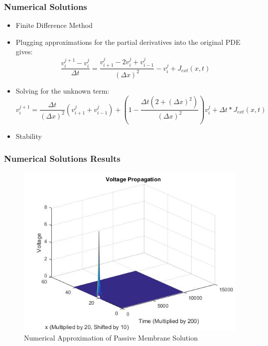 \documentclass{beamer}
\begin{document}
\begin{frame}
\frametitle{Numerical Solutions}
\begin{itemize}
	\item{Finite Difference Method}
	\item{Plugging approximations for the partial derivatives into the original PDE gives:}
\[\frac{v^{j+1}_i-v^j_i}{\Delta{t}}=\frac{v^{j}_{i+1}-2v^j_i+v^j_{i-1}}{(\Delta{x})^2}-v^j_i+J_{ext}(x,t)\]
	\item{Solving for the unknown term:}
\[v^{j+1}_i=\frac{\Delta{t}}{(\Delta{x})^2}(v^{j}_{i+1}+v^{j}_{i-1})+(1-\frac{\Delta{t}(2+(\Delta{x})^2)}{(\Delta{x})^2})v^{j}_{i}+\Delta{t}*J_{ext}(x,t)\]
	\item{Stability}
\end{itemize}

\end{frame}

\begin{frame}
\frametitle{Numerical Solutions Results}
\begin{figure}[H]
  \includegraphics[width=\linewidth]{Plot2.jpg}
  \caption{Numerical Approximation of Passive Membrane Solution}
  \label{fig:sketch2}
\end{figure}
\end{frame}
\end{document}
